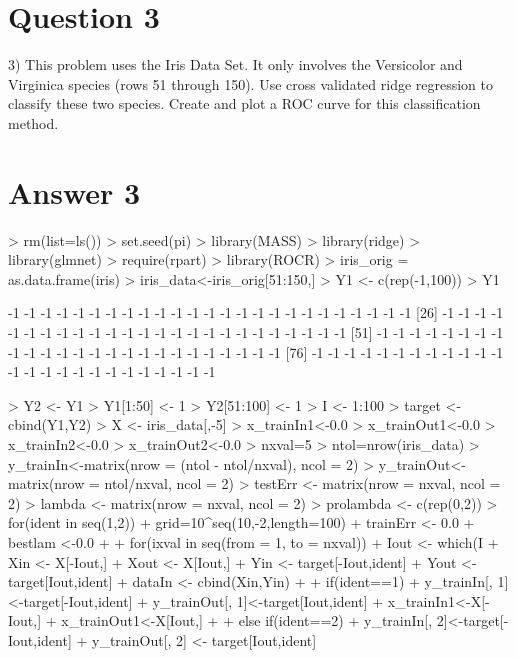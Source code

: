 \documentclass{article}
\begin{document}
\section*{Question 3}
3) This problem uses the Iris Data Set. It only involves the Versicolor and
Virginica species (rows 51 through 150). Use cross validated ridge
regression to classify these two species. Create and plot a ROC curve for
this classification method.
\section*{Answer 3}
\begin{Schunk}
\begin{Sinput}
> rm(list=ls())
> set.seed(pi)
> library(MASS)
> library(ridge)
> library(glmnet)
> require(rpart)
> library(ROCR)
> iris_orig = as.data.frame(iris)
> iris_data<-iris_orig[51:150,]
> Y1 <- c(rep(-1,100))
> Y1
\end{Sinput}
\begin{Soutput}
  [1] -1 -1 -1 -1 -1 -1 -1 -1 -1 -1 -1 -1 -1 -1 -1 -1 -1 -1 -1 -1 -1 -1 -1 -1 -1
 [26] -1 -1 -1 -1 -1 -1 -1 -1 -1 -1 -1 -1 -1 -1 -1 -1 -1 -1 -1 -1 -1 -1 -1 -1 -1
 [51] -1 -1 -1 -1 -1 -1 -1 -1 -1 -1 -1 -1 -1 -1 -1 -1 -1 -1 -1 -1 -1 -1 -1 -1 -1
 [76] -1 -1 -1 -1 -1 -1 -1 -1 -1 -1 -1 -1 -1 -1 -1 -1 -1 -1 -1 -1 -1 -1 -1 -1 -1
\end{Soutput}
\begin{Sinput}
> Y2 <- Y1
> Y1[1:50] <- 1        
> Y2[51:100] <- 1      
> I <- 1:100
> target <- cbind(Y1,Y2)
> X <- iris_data[,-5]
> x_trainIn1<-0.0
> x_trainOut1<-0.0
> x_trainIn2<-0.0
> x_trainOut2<-0.0
> nxval=5 
> ntol=nrow(iris_data) 
> y_trainIn<-matrix(nrow = (ntol - ntol/nxval), ncol = 2)
> y_trainOut<-matrix(nrow = ntol/nxval, ncol = 2)
> testErr <- matrix(nrow = nxval, ncol = 2)
> lambda <- matrix(nrow = nxval, ncol = 2)
> prolambda <- c(rep(0,2)) 
> for(ident in seq(1,2)){  
+     grid=10^seq(10,-2,length=100)
+     trainErr <- 0.0
+     bestlam <-0.0
+     
+     for(ixval in seq(from = 1, to = nxval)){
+         Iout <- which(I%%nxval== ixval - 1)
+         Xin <- X[-Iout,]
+         Xout <- X[Iout,]
+         Yin <- target[-Iout,ident]  
+         Yout <- target[Iout,ident]  
+         dataIn <- cbind(Xin,Yin)
+         
+         if(ident==1){
+             y_trainIn[, 1]<-target[-Iout,ident]
+             y_trainOut[, 1]<-target[Iout,ident]
+             x_trainIn1<-X[-Iout,]
+             x_trainOut1<-X[Iout,]
+             }
+         else if(ident==2) {
+             y_trainIn[, 2]<-target[-Iout,ident]
+             y_trainOut[, 2] <- target[Iout,ident]
}}}
\end{Sinput}
\end{Schunk}
\end{document}
